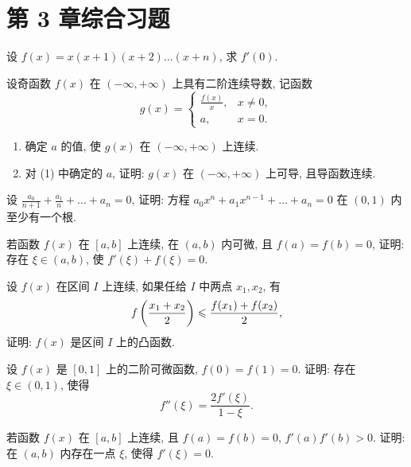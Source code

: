 \section{第 3 章综合习题}

\begin{exercise}[3.C.1]
    设 $f(x) = x(x+1)(x+2)\dots(x+n)$, 求 $f'(0)$.
\end{exercise}

\begin{exercise}[3.C.2]
    设奇函数 $f(x)$ 在 $(-\infty, +\infty)$ 上具有二阶连续导数, 记函数
    $$g(x) = \begin{cases} \frac{f(x)}{x}, & x \ne 0, \\ a, & x = 0. \end{cases}$$
    \begin{enumerate}
        \item 确定 $a$ 的值, 使 $g(x)$ 在 $(-\infty, +\infty)$ 上连续.
        \item 对 (1) 中确定的 $a$, 证明: $g(x)$ 在 $(-\infty, +\infty)$ 上可导, 且导函数连续.
    \end{enumerate}
\end{exercise}

\begin{exercise}[3.C.3]
    设 $\frac{a_0}{n+1} + \frac{a_1}{n} + \dots + a_n = 0$, 证明: 方程 $a_0 x^n + a_1 x^{n-1} + \dots + a_n = 0$ 在 $(0, 1)$ 内至少有一个根.
\end{exercise}

\begin{exercise}[3.C.4]
    若函数 $f(x)$ 在 $[a, b]$ 上连续, 在 $(a, b)$ 内可微, 且 $f(a) = f(b) = 0$, 证明: 存在 $\xi \in (a, b)$, 使 $f'(\xi) + f(\xi) = 0$.
\end{exercise}

\begin{exercise}[3.C.5]
    设 $f(x)$ 在区间 $I$ 上连续, 如果任给 $I$ 中两点 $x_1, x_2$, 有
    $$f\left(\frac{x_1 + x_2}{2}\right) \leqslant \frac{f(x_1) + f(x_2)}{2},$$
    证明: $f(x)$ 是区间 $I$ 上的凸函数.
\end{exercise}

\begin{exercise}[3.C.6]
    设 $f(x)$ 是 $[0, 1]$ 上的二阶可微函数, $f(0) = f(1) = 0$. 证明: 存在 $\xi \in (0, 1)$, 使得
    $$f''(\xi) = \frac{2 f'(\xi)}{1 - \xi}.$$
\end{exercise}

\begin{exercise}[3.C.7]
    若函数 $f(x)$ 在 $[a, b]$ 上连续, 且 $f(a) = f(b) = 0$, $f'(a)f'(b) > 0$. 证明: 在 $(a, b)$ 内存在一点 $\xi$, 使得 $f'(\xi) = 0$.
\end{exercise}

